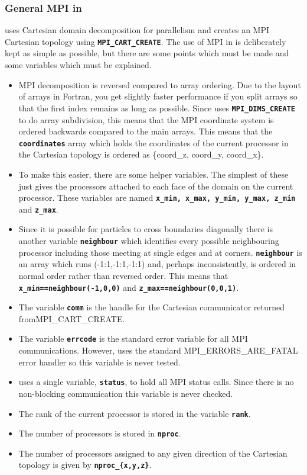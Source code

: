 \documentclass[12pt,a4paper]{article}
\newcommand{\inlinecode}[1]{{\color{warwickred} \bf\texttt{#1}}}
\newcommand{\EPOCH}{{\color{warwickdark}\fontfamily{phv}\selectfont{EPOCH}}}
\begin{document}
\subsubsection{General MPI in {\EPOCH}}
{\EPOCH} uses Cartesian domain decomposition for parallelism and creates an MPI
Cartesian topology using \inlinecode{MPI\_CART\_CREATE}. The use of MPI in
{\EPOCH} is deliberately kept as simple as possible, but there are some points
which must be made and some variables which must be explained.
\begin{itemize}
\item MPI decomposition is reversed compared to array ordering. Due to the
  layout of arrays in Fortran, you get slightly faster performance if you split
  arrays so that the first index remains as long as possible. Since {\EPOCH}
  uses \inlinecode{MPI\_DIMS\_CREATE} to do array subdivision, this means that
  the MPI coordinate system is ordered backwards compared to the main arrays.
  This means that the \inlinecode{coordinates} array which holds the
  coordinates of the current processor in the Cartesian topology is ordered
  as \{coord\_z, coord\_y, coord\_x\}.
\item To make this easier, there are some helper variables. The simplest of
  these just gives the processors attached to each face of the domain on the
  current processor. These variables are named \inlinecode{x\_min, x\_max,
  y\_min, y\_max, z\_min} and \inlinecode{z\_max}.
\item Since it is possible for particles to cross boundaries diagonally there
  is another variable \inlinecode{neighbour} which identifies every possible
  neighbouring processor including those meeting at single edges and at
  corners. \inlinecode{neighbour} is an array which runs (-1:1,-1:1,-1:1) and,
  perhaps inconsistently, is ordered in normal order rather than reversed
  order. This means that \inlinecode{x\_min==neighbour(-1,0,0)} and
  \inlinecode{z\_max==neighbour(0,0,1)}.
\item The variable \inlinecode{comm} is the handle for the Cartesian
  communicator returned from\linebreak MPI\_CART\_CREATE.
\item The variable \inlinecode{errcode} is the standard error variable for all
  MPI communications. However, {\EPOCH} uses the standard
  MPI\_ERRORS\_ARE\_FATAL error handler so this variable is never tested.
\item {\EPOCH} uses a single variable, \inlinecode{status}, to hold all MPI
  status calls. Since there is no non-blocking communication this variable
  is never checked.
\item The rank of the current processor is stored in the variable
  \inlinecode{rank}.
\item The number of processors is stored in \inlinecode{nproc}.
\item The number of processors assigned to any given direction of the Cartesian
  topology is given by \inlinecode{nproc\_\{x,y,z\}}.
\end{itemize}
\end{document}

